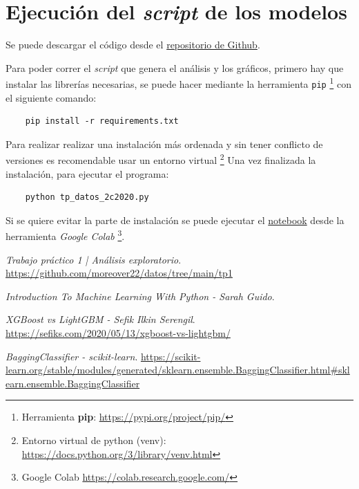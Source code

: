 \documentclass[titlepage,a4paper]{article}
\begin{document}
\newpage
\appendix
\section{Ejecución del \textit{script} de los modelos}

Se puede descargar el código desde el \href{https://github.com/moreover22/datos/tree/main/tp2}{repositorio de Github}.

Para poder correr el \textit{script} que genera el análisis y los gráficos, primero hay que instalar las librerías necesarias, se puede hacer mediante la herramienta \verb|pip| \footnote{Herramienta \textbf{pip}: \url{https://pypi.org/project/pip/}} con el siguiente comando:

\begin{verbatim}
    pip install -r requirements.txt
\end{verbatim}

Para realizar realizar una instalación más ordenada y sin tener conflicto de versiones es recomendable usar un entorno virtual \footnote{Entorno virtual de python (venv): \url{https://docs.python.org/3/library/venv.html}}
Una vez finalizada la instalación, para ejecutar el programa:

\begin{verbatim}
    python tp_datos_2c2020.py
\end{verbatim}


Si se quiere evitar la parte de instalación se puede ejecutar el \href{https://colab.research.google.com/drive/1cIS9cFXRtDXCx1CANUsSSSPxUlPxwVtn?usp=sharing}{notebook} desde la herramienta \textit{Google Colab} \footnote{Google Colab \url{https://colab.research.google.com/}}.

\newpage
\begin{thebibliography}{9}



\cprotect\textit{Trabajo práctico 1 | Análisis exploratorio}. 
\url{https://github.com/moreover22/datos/tree/main/tp1}

\cprotect\textit{Introduction To Machine Learning With Python - Sarah Guido}.

\cprotect\textit{XGBoost vs LightGBM - Sefik Ilkin Serengil}. 
\url{https://sefiks.com/2020/05/13/xgboost-vs-lightgbm/}


\cprotect\textit{BaggingClassifier - scikit-learn}. 
\url{https://scikit-learn.org/stable/modules/generated/sklearn.ensemble.BaggingClassifier.html#sklearn.ensemble.BaggingClassifier}

\end{thebibliography}
\end{document}
